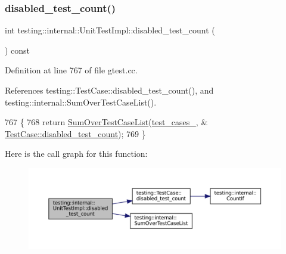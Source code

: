 \subsubsection{\texorpdfstring{disabled\+\_\+test\+\_\+count()}{disabled\_test\_count()}}
{\footnotesize\ttfamily int testing\+::internal\+::\+Unit\+Test\+Impl\+::disabled\+\_\+test\+\_\+count (\begin{DoxyParamCaption}{ }\end{DoxyParamCaption}) const}



Definition at line 767 of file gtest.\+cc.



References testing\+::\+Test\+Case\+::disabled\+\_\+test\+\_\+count(), and testing\+::internal\+::\+Sum\+Over\+Test\+Case\+List().


\begin{DoxyCode}
767                                             \{
768   \textcolor{keywordflow}{return} \hyperlink{namespacetesting_1_1internal_a564f9e608c608736ebe2199ab831745b}{SumOverTestCaseList}(\hyperlink{classtesting_1_1internal_1_1UnitTestImpl_a79ec0f733ada2898efd1a7fbd8587fb3}{test\_cases\_}, &
      \hyperlink{classtesting_1_1TestCase_a8ef690ab8ec74d02c99416637de71ae8}{TestCase::disabled\_test\_count});
769 \}
\end{DoxyCode}
Here is the call graph for this function\+:
\nopagebreak
\begin{figure}[H]
\begin{center}
\leavevmode
\includegraphics[width=350pt]{classtesting_1_1internal_1_1UnitTestImpl_a0c18b2a9cb240722b1e38a3530aa2269_cgraph}
\end{center}
\end{figure}
\mbox{\label{classtesting_1_1internal_1_1UnitTestImpl_a4376881063f945dcc8ec4dbb38b5ecc1}} 
